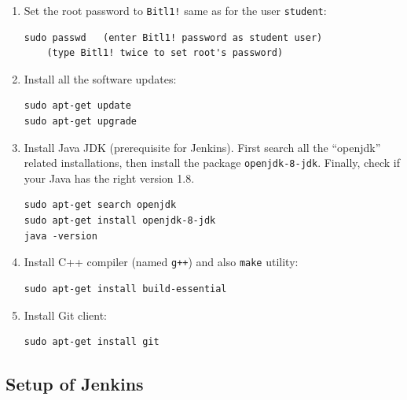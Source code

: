 \documentclass[11pt,a4paper]{article}
\begin{document}
\begin{enumerate}
\item Set the root password to {\tt Bitl1!} \textendash{} same as for the user {\tt student}:
\begin{verbatim}
sudo passwd   (enter Bitl1! password as student user)
    (type Bitl1! twice to set root's password)
\end{verbatim}
\item Install all the software updates:
\begin{verbatim}
sudo apt-get update
sudo apt-get upgrade
\end{verbatim}
\item Install Java JDK (prerequisite for Jenkins). First search all the ``openjdk'' related installations, 
then install the package {\tt openjdk-8-jdk}. Finally, check if your Java has the right version 1.8.
\begin{verbatim}
sudo apt-get search openjdk
sudo apt-get install openjdk-8-jdk
java -version
\end{verbatim}
\item Install C++ compiler (named {\tt g++}) and also {\tt make} utility:
\begin{verbatim}
sudo apt-get install build-essential
\end{verbatim}
\item Install Git client:
\begin{verbatim}
sudo apt-get install git
\end{verbatim}
\end{enumerate}



\subsection{Setup of Jenkins}
\end{document}
